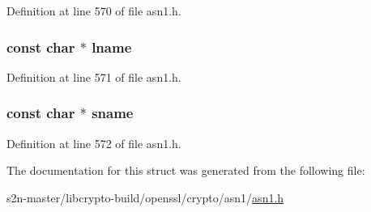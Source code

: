 Definition at line 570 of file asn1.\+h.

\subsubsection[{\texorpdfstring{lname}{lname}}]{\setlength{\rightskip}{0pt plus 5cm}const char $\ast$ lname}\hypertarget{struct_b_i_t___s_t_r_i_n_g___b_i_t_n_a_m_e__st_a988203a1d0328d0bf5b4a4f06b492674}{}\label{struct_b_i_t___s_t_r_i_n_g___b_i_t_n_a_m_e__st_a988203a1d0328d0bf5b4a4f06b492674}


Definition at line 571 of file asn1.\+h.

\subsubsection[{\texorpdfstring{sname}{sname}}]{\setlength{\rightskip}{0pt plus 5cm}const char $\ast$ sname}\hypertarget{struct_b_i_t___s_t_r_i_n_g___b_i_t_n_a_m_e__st_a4b80c486312c118a491cc0d75a52d6e0}{}\label{struct_b_i_t___s_t_r_i_n_g___b_i_t_n_a_m_e__st_a4b80c486312c118a491cc0d75a52d6e0}


Definition at line 572 of file asn1.\+h.



The documentation for this struct was generated from the following file\+:\begin{DoxyCompactItemize}
\item 
s2n-\/master/libcrypto-\/build/openssl/crypto/asn1/\hyperlink{crypto_2asn1_2asn1_8h}{asn1.\+h}\end{DoxyCompactItemize}
